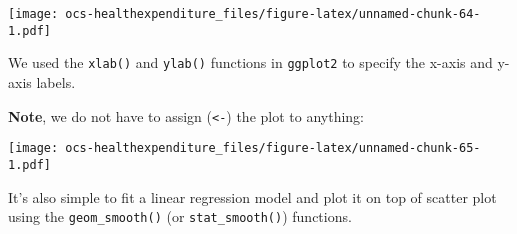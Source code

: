 \documentclass[]{article}
\newenvironment{Shaded}{\begin{snugshade}}{\end{snugshade}}
\newcommand{\DataTypeTok}[1]{\textcolor[rgb]{0.13,0.29,0.53}{#1}}
\newcommand{\KeywordTok}[1]{\textcolor[rgb]{0.13,0.29,0.53}{\textbf{#1}}}
\newcommand{\NormalTok}[1]{#1}
\newcommand{\OperatorTok}[1]{\textcolor[rgb]{0.81,0.36,0.00}{\textbf{#1}}}
\newcommand{\StringTok}[1]{\textcolor[rgb]{0.31,0.60,0.02}{#1}}
\begin{document}
\begin{Shaded}
\end{Shaded}

\texttt{[image: ocs-healthexpenditure\_files/figure-latex/unnamed-chunk-64-1.pdf]}

We used the \texttt{xlab()} and \texttt{ylab()} functions in
\texttt{ggplot2} to specify the x-axis and y-axis labels.

\textbf{Note}, we do not have to assign (\texttt{\textless{}-}) the plot
to anything:

\begin{Shaded}
\end{Shaded}

\texttt{[image: ocs-healthexpenditure\_files/figure-latex/unnamed-chunk-65-1.pdf]}

It's also simple to fit a linear regression model and plot it on top of
scatter plot using the \texttt{geom\_smooth()} (or
\texttt{stat\_smooth()}) functions.
\end{document}
